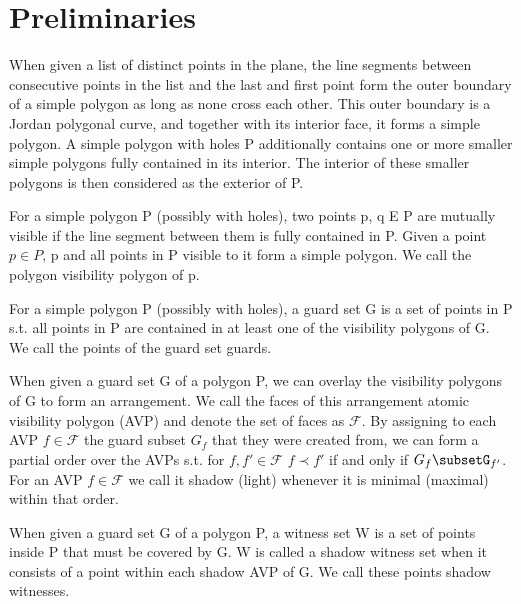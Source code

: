 \chapter{Preliminaries}
\begin{definition}
When given a list of distinct points in the plane, the line segments between consecutive points in the list and the last and first point form the outer boundary of a simple polygon as long as none cross each other. This outer boundary is a Jordan polygonal curve, and together with its interior face, it forms a simple polygon. A simple polygon with holes P additionally contains one or more smaller simple polygons fully contained in its interior. The interior of these smaller polygons is then considered as the exterior of P.
\end{definition}

\begin{definition}
For a simple polygon P (possibly with holes), two points p, q E P are mutually visible if the line segment between them is fully contained in P. Given a point $p\in P$, p and all points in P visible to it form a simple polygon. We call the polygon visibility polygon of p.
\end{definition}

\begin{definition}
For a simple polygon P (possibly with holes), a guard set G is a set of points in P s.t. all points in P are contained in at least one of the visibility polygons of G. We call the points of the guard set guards.
\end{definition}

\begin{definition}
When given a guard set G of a polygon P, we can overlay the visibility polygons of G to form an arrangement. We call the faces of this arrangement atomic visibility polygon (AVP) and denote the set of faces as $\mathcal{F}$. By assigning to each AVP $f\in\mathcal{F}$ the guard subset $G_{f}$ that they were created from, we can form a partial order over the AVPs s.t. for $f,f'\in\mathcal{F}$ $f\prec f'$ if and only if $G_{f}\subsetG_{f'}$. For an AVP $f\in\mathcal{F}$ we call it shadow (light) whenever it is minimal (maximal) within that order.
\end{definition}

\begin{definition}
When given a guard set G of a polygon P, a witness set W is a set of points inside P that must be covered by G. W is called a shadow witness set when it consists of a point within each shadow AVP of G. We call these points shadow witnesses.
\end{definition}

